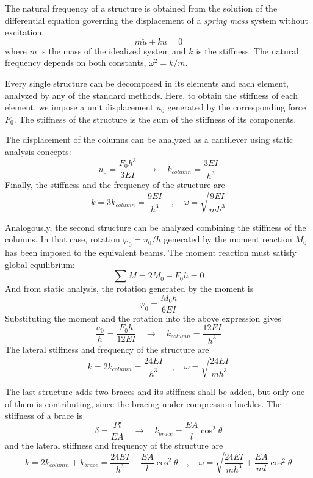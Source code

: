 The natural frequency of a structure is obtained from the solution of the differential equation governing the displacement of a \emph{spring mass} system without excitation.
$$
m\ddot{u}+ku=0
$$
where $m$ is the mass of the idealized system and $k$ is the stiffness. The natural frequency depends on both constants, $\omega^2 = k/m$.

Every single structure can be decomposed in its elements and each element, analyzed by any of the standard methods. Here, to obtain the stiffness of each element, we impose a unit displacement $u_0$ generated by the corresponding force $F_0$. The stiffness of the structure is the sum of the stiffness of its components.

\begin{center}
\end{center}

The displacement of the columns can be analyzed as a cantilever using static analysis concepts:
$$
u_0 = \frac{F_0h^3}{3EI} \quad \rightarrow \quad k_{column} = \frac{3EI}{h^3}
$$
Finally, the stiffness and the frequency of the structure are
$$
k = 3k_{column} = \frac{9EI}{h^3} \quad , \quad \omega = \sqrt{\frac{9EI}{mh^3}}
$$

\begin{center}
\end{center}

Analogously, the second structure can be analyzed combining the stiffness of the columns. In that case, rotation $\varphi_0 = u_0/h$ generated by the moment reaction $M_0$ has been imposed to the equivalent beams. The moment reaction must satisfy global equilibrium:
$$
\sum M = 2M_0 -F_0h = 0
$$
And from static analysis, the rotation generated by the moment is
$$
\varphi_0 = \frac{M_0h}{6EI}
$$
Substituting the moment and the rotation into the above expression gives
$$
\frac{u_0}{h} = \frac{F_0h}{12EI} \quad \rightarrow \quad k_{column} = \frac{12EI}{h^3}
$$
The lateral stiffness and frequency of the structure are
$$
k = 2k_{column} = \frac{24EI}{h^3} \quad , \quad \omega = \sqrt{\frac{24EI}{mh^3}}
$$

\begin{center}
\end{center}

The last structure adds two braces and its stiffness shall be added, but only one of them is contributing, since the bracing under compression buckles. The stiffness of a brace is
$$
\delta = \frac{Pl}{EA} \quad \rightarrow \quad k_{brace} = \frac{EA}{l}\cos^2\theta
$$
and the lateral stiffness and frequency of the structure are
$$
k = 2k_{column} + k_{brace} = \frac{24EI}{h^3}+\frac{EA}{l}\cos^2\theta \quad , \quad 
\omega = \sqrt{\frac{24EI}{mh^3}+\frac{EA}{ml}\cos^2\theta}
$$



